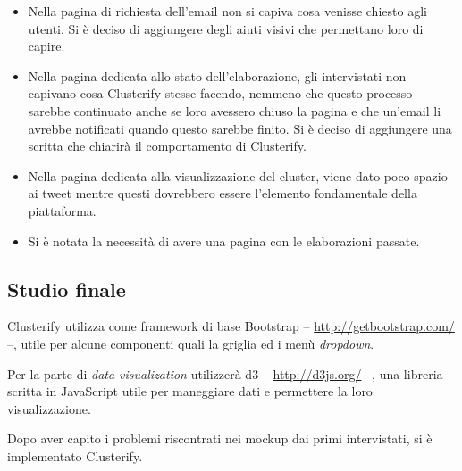 	\begin{itemize}
		\item  Nella pagina di richiesta dell'email non si capiva cosa venisse chiesto agli utenti. Si è deciso di aggiungere degli aiuti visivi che permettano loro di capire.
            
            	\item Nella pagina dedicata allo stato dell'elaborazione, gli intervistati non capivano cosa Clusterify stesse facendo, nemmeno che questo processo sarebbe continuato anche se loro avessero chiuso la pagina e che un'email li avrebbe notificati quando questo sarebbe finito. Si è deciso di aggiungere una scritta che chiarirà il comportamento di Clusterify. 
                        
            	\item Nella pagina dedicata alla visualizzazione del cluster, viene dato poco spazio ai tweet mentre questi dovrebbero essere l'elemento fondamentale della piattaforma.
            
            	\item Si è notata la necessità di avere una pagina con le elaborazioni passate.
            \end{itemize}
            

\subsection{Studio finale}        
	Clusterify utilizza come framework di base Bootstrap -- \url{http://getbootstrap.com/} --, utile per alcune componenti quali la griglia ed i menù \emph{dropdown}.
        
	Per la parte di \emph{data visualization} utilizzerà d3 -- \url{http://d3js.org/} --, una libreria scritta in JavaScript utile per maneggiare dati e permettere la loro visualizzazione.
        
	Dopo aver capito i problemi riscontrati nei mockup dai primi intervistati, si è implementato Clusterify.

